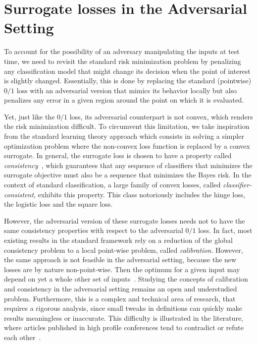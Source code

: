 \section{Surrogate losses in the Adversarial Setting}
\label{sec:rw-q2}
To account for the possibility of an adversary manipulating the inputs at test time, we need to revisit the standard risk minimization problem by penalizing any classification model that might change its decision when the point of interest is slightly changed. Essentially, this is done by replacing the standard (pointwise) $0/1$ loss with an adversarial version that mimics its behavior locally but also penalizes any error in a given region around the point on which it is evaluated.


Yet, just like the $0/1$ loss, its adversarial counterpart is not convex, which renders the risk minimization difficult. To circumvent this limitation, we take inspiration from the standard learning theory approach which consists in solving a simpler optimization problem where the non-convex loss function is replaced by a convex surrogate. In general, the surrogate loss is chosen to have a property called \emph{consistency}~\citep{zhang2004statistical,bartlett2006convexity,steinwart2007compare}, which guarantees that any sequence of classifiers that minimizes the surrogate objective must also be a sequence that minimizes the Bayes risk. In the context of standard classification, a large family of convex losses, called \textit{classifier-consistent}, exhibits this property. This class notoriously includes the hinge loss, the logistic loss and the square loss. 

However, the adversarial version of these surrogate losses needs not to have the same consistency properties with respect to the adversarial $0/1$ loss. In fact, most existing results in the standard framework rely on a reduction of the global consistency problem to a local point-wise problem, called \textit{calibration}. However, the same approach is not feasible in the adversarial setting, because the new losses are by nature non-point-wise. Then the optimum for a given input may depend on yet a whole other set of inputs~\citep{awasthi2021calibration,awasthi2021finer}. Studying the concepts of calibration and consistency in the adversarial setting remains an open and understudied problem. 
Furthermore, this is a complex and technical area of research, that requires a rigorous analysis, since small tweaks in definitions can quickly make results meaningless or inaccurate.
This difficulty is illustrated in the literature, where articles published in high profile conferences tend to contradict or refute each other~\cite{bao2020calibrated,awasthi2021calibration,awasthi2021finer}. 





